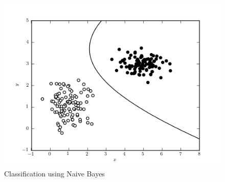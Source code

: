 \documentclass[paper=a4, fontsize=12pt]{scrartcl}
\numberwithin{equation}{section}		%
\numberwithin{figure}{section}			%
\numberwithin{table}{section}				%
\begin{document}
\begin{figure}[H]

\begin{center}

\includegraphics[scale=.6]{nb_scatterplot.png}

 \end{center}

  \caption{Classification using Naive Bayes }

  \label{fig:}

\end{figure}
\end{document}
